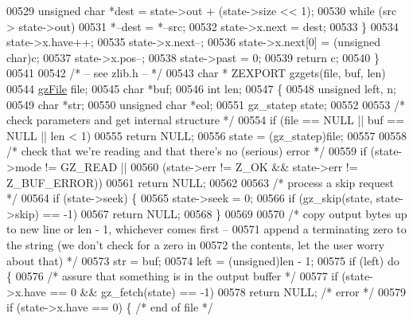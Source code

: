 \begin{DoxyCode}
00529         \textcolor{keywordtype}{unsigned} \textcolor{keywordtype}{char} *dest = state->out + (state->size << 1);
00530         \textcolor{keywordflow}{while} (src > state->out)
00531             *--dest = *--src;
00532         state->x.next = dest;
00533     \}
00534     state->x.have++;
00535     state->x.next--;
00536     state->x.next[0] = (\textcolor{keywordtype}{unsigned} char)c;
00537     state->x.pos--;
00538     state->past = 0;
00539     \textcolor{keywordflow}{return} c;
00540 \}
00541 
00542 \textcolor{comment}{/* -- see zlib.h -- */}
00543 \textcolor{keywordtype}{char} * ZEXPORT gzgets(file, buf, len)
00544     \hyperlink{structgz_file__s}{gzFile} file;
00545     \textcolor{keywordtype}{char} *buf;
00546     \textcolor{keywordtype}{int} len;
00547 \{
00548     \textcolor{keywordtype}{unsigned} left, n;
00549     \textcolor{keywordtype}{char} *str;
00550     \textcolor{keywordtype}{unsigned} \textcolor{keywordtype}{char} *eol;
00551     gz\_statep state;
00552 
00553     \textcolor{comment}{/* check parameters and get internal structure */}
00554     \textcolor{keywordflow}{if} (file == NULL || buf == NULL || len < 1)
00555         \textcolor{keywordflow}{return} NULL;
00556     state = (gz\_statep)file;
00557 
00558     \textcolor{comment}{/* check that we're reading and that there's no (serious) error */}
00559     \textcolor{keywordflow}{if} (state->mode != GZ\_READ ||
00560         (state->err != Z\_OK && state->err != Z\_BUF\_ERROR))
00561         \textcolor{keywordflow}{return} NULL;
00562 
00563     \textcolor{comment}{/* process a skip request */}
00564     \textcolor{keywordflow}{if} (state->seek) \{
00565         state->seek = 0;
00566         \textcolor{keywordflow}{if} (gz\_skip(state, state->skip) == -1)
00567             \textcolor{keywordflow}{return} NULL;
00568     \}
00569 
00570     \textcolor{comment}{/* copy output bytes up to new line or len - 1, whichever comes first --}
00571 \textcolor{comment}{       append a terminating zero to the string (we don't check for a zero in}
00572 \textcolor{comment}{       the contents, let the user worry about that) */}
00573     str = buf;
00574     left = (unsigned)len - 1;
00575     \textcolor{keywordflow}{if} (left) \textcolor{keywordflow}{do} \{
00576         \textcolor{comment}{/* assure that something is in the output buffer */}
00577         \textcolor{keywordflow}{if} (state->x.have == 0 && gz\_fetch(state) == -1)
00578             \textcolor{keywordflow}{return} NULL;                \textcolor{comment}{/* error */}
00579         \textcolor{keywordflow}{if} (state->x.have == 0) \{       \textcolor{comment}{/* end of file */}

\end{DoxyCode}
